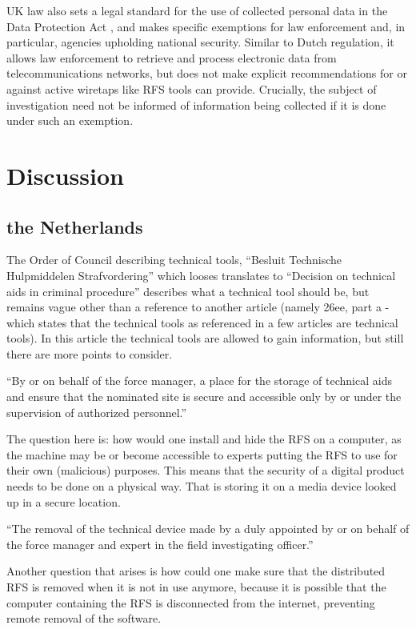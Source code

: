 \documentclass[11pt]{article} %
\begin{document}
UK law also sets a legal standard for the use of collected personal data in the Data Protection Act \cite{dpact}, and makes specific exemptions for law enforcement and, in particular, agencies upholding national security.
Similar to Dutch regulation, it allows law enforcement to retrieve and process electronic data from telecommunications networks, but does not make explicit recommendations for or against active wiretaps like RFS tools can provide.
Crucially, the subject of investigation need not be informed of information being collected if it is done under such an exemption.

\section{Discussion}

\subsection{the Netherlands}
The Order of Council describing technical tools, ``Besluit Technische Hulpmiddelen Strafvordering'' which looses translates to ``Decision on technical aids in criminal procedure'' \cite{besluit} describes what a technical tool should be, but remains vague other than a reference to another article (namely 26ee, part a - which states that the technical tools as referenced in a few articles are technical tools).
In this article the technical tools are allowed to gain information, but still there are more points to consider.

``By or on behalf of the force manager, a place for the storage of technical aids and ensure that the nominated site is secure and accessible only by or under the supervision of authorized personnel.'' %

The question here is: how would one install and hide the RFS on a computer, as the machine may be or become accessible to experts putting the RFS to use for their own (malicious) purposes.
This means that the security of a digital product needs to be done on a physical way.
That is storing it on a media device looked up in a secure location.

``The removal of the technical device made by a duly appointed by or on behalf of the force manager and expert in the field investigating officer.''

Another question that arises is how could one make sure that the distributed RFS is removed when it is not in use anymore, because it is possible that the computer containing the RFS is disconnected from the internet, preventing remote removal of the software.
\end{document}
